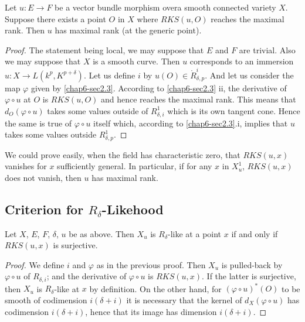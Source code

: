 \begin{prop*}
Let $u:E\to F$ be a vector bundle morphism over\pageoriginale a smooth
connected variety $X$. Suppose there exists a point $O$ in $X$ where
$RKS(u,O)$ reaches the maximal rank. Then $u$ has maximal rank (at the
generic point). 
\end{prop*}

\begin{proof}
The statement being local, we may suppose that $E$ and $F$ are
trivial. Also we may suppose that $X$ is a smooth curve. Then $u$
corresponds to an immersion $u:X\to L(k^{p},K^{p+\delta})$. Let us
define $i$ by $u(O)\in \ring{R}^{i}_{\delta,p}$. And let us consider
the map $\varphi$ given by \ref{chap6-sec2.3}. According
to \ref{chap6-sec2.3} ii, the derivative of $\varphi\circ u$ at $O$ is
$RKS(u,O)$ and hence reaches the maximal rank. This means that
$d_{O}(\varphi\circ u)$ takes some values outside of
$R^{1}_{\delta,i}$ which is its own tangent cone. Hence the same is
true of $\varphi\circ u$ itself which, according
to \ref{chap6-sec2.3}.i, implies that $u$ takes some values outside
$R^{1}_{\delta,p}$. 
\end{proof}

\begin{remark*}
We could prove easily, when the field has characteristic zero, that
$RKS(u,x)$ vanishes for $x$ sufficiently general. In particular, if
for any $x$ in $X^{1}_{u}$, $RKS(u,x)$ does not vanish, then $u$ has
maximal rank.
\end{remark*}

\subsection{Criterion for \texorpdfstring{$R_{\delta}$}{Rd}-Likehood}\label{chap6-sec3.4}

\begin{prop*}
Let $X$, $E$, $F$, $\delta$, $u$ be as above. Then $X_{u}$ is
$R_{\delta}$-like at a point $x$ if and only if $RKS(u,x)$ is
surjective. 
\end{prop*}

\begin{proof}
We define $i$ and $\varphi$ as in the previous proof. Then $X_{u}$ is
pulled-back by $\varphi\circ u$ of $R_{\delta,i}$; and the derivative
of $\varphi\circ u$ is $RKS(u,x)$. If the latter is surjective, then
$X_{u}$ is $R_{\delta}$-like at $x$ by definition. On the other hand,
for $(\varphi\circ u)^{*}(O)$ to be smooth of codimension
$i(\delta+i)$ it is necessary that the kernel of $d_{X}(\varphi\circ
u)$ has codimension $i(\delta+i)$, hence that its image has dimension
$i(\delta+i)$. 
\end{proof}


